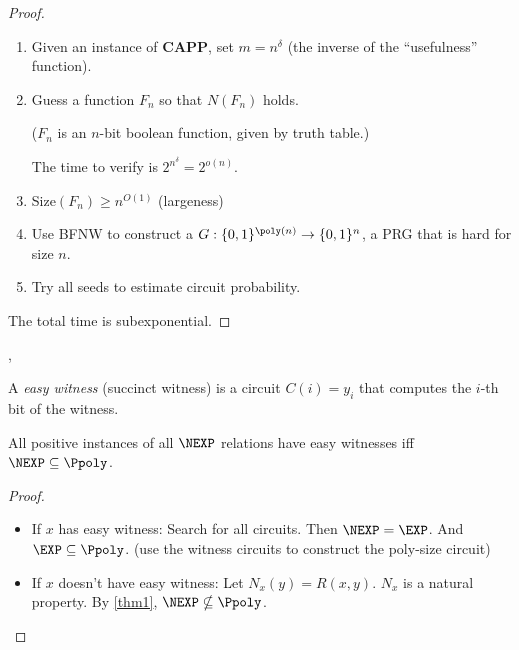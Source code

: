 \documentclass[letterpaper, 12pt]{article}
\newcommand{\CAPP}{\mathbf{CAPP}}
\begin{document}
\begin{proof} \item
	\begin{enumerate}
		\item Given an instance of $\CAPP$, set $m = n^\delta$ (the inverse of the ``usefulness'' function).
		\item Guess a function $F_n$ so that $N(F_n)$ holds.
		
		($F_n$ is an $n$-bit boolean function, given by truth table.)
		
		The time to verify is $2^{n^\delta} = 2^{o(n)}$.
		\item Size$(F_n) \geq n^{O(1)}$ (largeness) %
		\item Use BFNW to construct a $G: \{0,1\}^{\poly(n)} \rightarrow \{0,1\}^n$, a PRG that is hard for size $n$.
		\item Try all seeds to estimate circuit probability.
	\end{enumerate}
	The total time is subexponential.
\end{proof}

\sep

A \emph{easy witness} (succinct witness) is a circuit $C(i) = y_i$ that computes the $i$-th bit of the witness.

\begin{theorem}
	All positive instances of all $\NEXP$ relations have easy witnesses iff $\NEXP \subseteq \Ppoly$.
\end{theorem}

\begin{proof}\item
	\begin{itemize}
	\item If $x$ has easy witness: Search for all circuits. Then $\NEXP = \EXP$. And $\EXP \subseteq \Ppoly$. (use the witness circuits to construct the poly-size circuit)
	\item If $x$ doesn't have easy witness: Let $N_x(y) = R(x,y)$. $N_x$ is a natural property. By \ref{thm1}, $\NEXP \nsubseteq \Ppoly$.
\end{itemize}
\end{proof}
\end{document}
